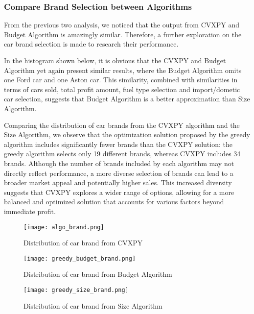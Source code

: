 \documentclass{article}
\begin{document}
\subsubsection{Compare Brand Selection between Algorithms}
From the previous two analysis, we noticed that the output from CVXPY and Budget Algorithm is amazingly similar. Therefore, a further exploration on the car brand selection is made to research their performance. \par
In the histogram shown below, it is obvious that the CVXPY and Budget Algorithm yet again present similar results, where the Budget Algorithm omits one Ford car and one Aston car. This similarity, combined with similarities in terms of cars sold, total profit amount, fuel type selection and import/dometic car selection, suggests that Budget Algorithm is a better approximation than Size Algorithm.\par
Comparing the distribution of car brands from the CVXPY algorithm and the Size Algorithm, we observe that the optimization solution proposed by the greedy algorithm includes significantly fewer brands than the CVXPY solution: the greedy algorithm selects only 19 different brands, whereas CVXPY includes 34 brands. Although the number of brands included by each algorithm may not directly reflect performance, a more diverse selection of brands can lead to a broader market appeal and potentially higher sales. This increased diversity suggests that CVXPY explores a wider range of options, allowing for a more balanced and optimized solution that accounts for various factors beyond immediate profit.\par
\begin{figure}[h]
    \centering
    \begin{minipage}{0.45\textwidth}
        \centering
        \texttt{[image: algo\_brand.png]}
        \caption{Distribution of car brand from CVXPY}
        \label{fig:algo_brand}
    \end{minipage}\hfill
    \begin{minipage}{0.45\textwidth}
        \centering
        \texttt{[image: greedy\_budget\_brand.png]}
        \caption{Distribution of car brand from Budget Algorithm}
        \label{fig:algo_import}
    \end{minipage}\hfill
    \begin{minipage}{0.45\textwidth}
        \centering
        \texttt{[image: greedy\_size\_brand.png]}
        \caption{Distribution of car brand from Size Algorithm}
        \label{fig:greedy_budget_import}
    \end{minipage}
\end{figure}
\end{document}
